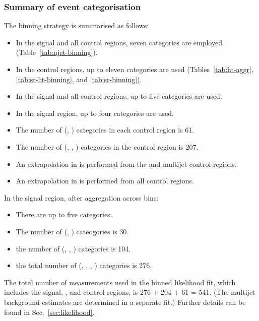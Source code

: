 \subsubsection{Summary of event categorisation}
\label{sec:binning-summary}

The binning strategy is summarised as follows: 
\begin{itemize}
\item In the signal and all control regions, seven \njet categories
  are employed (Table~\ref{tab:njet-binning}). 
\item In the control regions, up to eleven \scalht categories are
  used (Tables~\ref{tab:ht-aggr}, \ref{tab:sr-ht-binning}, and
  \ref{tab:sr-binning}).  
\item In the signal and all control regions, up to five \nb categories
  are used.
\item In the signal region, up to four \HTmiss categories are used.
\item The number of (\njet, \scalht) categories in each control region
  is 61.
\item The number of (\njet, \scalht, \nb) categories in the \mj
  control region is 207.
\item An extrapolation in \nb is performed from the \mmj and multijet
  control regions.
\item An extrapolation in \HTmiss is performed from all control regions.
\end{itemize}
In the signal region, after aggregation across \scalht bins: 
\begin{itemize}
\item There are up to five \scalht categories.
\item The number of (\njet, \scalht) cateogories is 30.
\item the number of (\njet, \scalht, \nb) categories is 104.
\item the total number of (\njet, \scalht, \nb, \HTmiss) categories is
  276. 
\end{itemize}

The total number of measurements used in the binned likelihood fit,
which includes the signal, \mj, and \mmj control regions, is 276 + 204
+ 61 = 541. (The multijet background estimates are determined in a
separate fit.) Further details can be found in
Sec.~\ref{sec:likelihood}.
